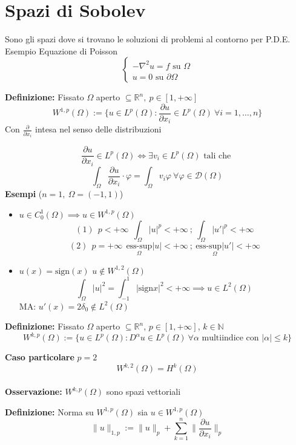 \documentclass[a4paper]{article}
\newcommand{\R}{\mathbb{R}}
\newcommand{\N}{\mathbb{N}}
\begin{document}
\section{Spazi di Sobolev}
Sono gli spazi dove si trovano le soluzioni di problemi al contorno per P.D.E.
\\Esempio Equazione di Poisson
\[\begin{cases}
	-\nabla ^2u=f\text{ su }\Omega
	\\u=0\text{ su }\partial\Omega
\end{cases}\]
\begin{tcolorbox}
	\textbf{Definizione: }Fissato $\Omega$ aperto $\subseteq  \R^n,\ p\in [1,+\infty]$
	\[W^{1,p}(\Omega):=\{u\in L^p(\Omega): \frac{\partial u}{\partial x_i} \in L^p(\Omega)\ \forall i=1,\ldots,n \} \]
	Con $\frac{\partial }{\partial x_i }$ intesa nel senso delle distribuzioni
\end{tcolorbox}
\[\frac{\partial u}{\partial x_i} \in L^p(\Omega) \iff \exists v_i\in L^p(\Omega)\text{ tali che }\]
\[\int_{\Omega}^{} \frac{\partial u}{\partial x_i} \cdot \varphi=\int_{\Omega}^{}v_i\varphi\ \forall \varphi\in \mathcal D(\Omega) \]
\textbf{Esempi} ($n=1,\ \Omega=(-1,1)$)
\begin{itemize}
	\item $u\in C^1_0(\Omega)\implies u\in W^{1,p}(\Omega)$
		\[(1) \ \ p<+ \infty\ \ \int_{\Omega}^{} |u|^p<+\infty\ ;\ \int_{\Omega}^{} |u'|^p<+\infty\]
		\[(2)\ \ p=+\infty\ \ \underset{\Omega}{\text{ess-sup}}|u|<+\infty\ ;\ \underset{\Omega}{\text{ess-sup}|u'|}<+\infty\]
	\item $u(x)=\text{sign}(x)$ $u\not\in W^{1,2}(\Omega)$ 
		\[\int_{\Omega}^{} |u|^2=\int_{-1}^{1} |\text{sign}x|^2<+\infty\implies u\in L^2(\Omega)  \]
		MA: $u'(x)=2\delta_0\not\in L^{2}(\Omega)$
\end{itemize}
\begin{tcolorbox}
	\textbf{Definizione: }Fissato $\Omega$ aperto $\subseteq  \R^n$, $p\in [1,+\infty]$, $k\in \N$
	\[W^{k,p}(\Omega):=\{u\in L^p(\Omega):D^\alpha u\in L^{p}(\Omega)\ \forall \alpha\text{ multiindice con }|\alpha|\le k\} \]
	
\end{tcolorbox}
\textbf{Caso particolare} $p=2$ 
\[W^{k,2}(\Omega)=H^k(\Omega)\]
\\\textbf{Osservazione: }$W^{k,p}(\Omega)$ sono spazi vettoriali
\begin{tcolorbox}
	\textbf{Definizione:} Norma su $W^{1,p}(\Omega)$ sia $u\in W^{1,p}(\Omega)$ 
	\[\|u\|_{1,p}:=\|u\|_p+\sum_{k=1}^{n} \bigg\|\frac{\partial u}{\partial x_i} \bigg\|_p\]

\end{tcolorbox}
\end{document}
